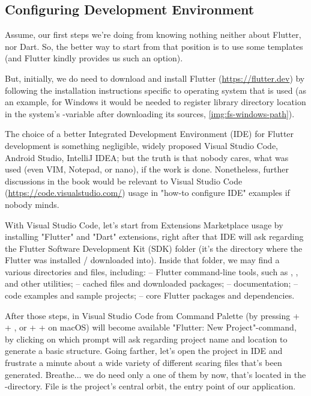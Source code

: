 
\subsection{Configuring Development Environment} \label{first-step}

Assume, our first steps we're doing from knowing nothing neither about Flutter, nor Dart. So, the better way to start 
from that position is to use some templates (and Flutter kindly provides us such an option).

But, initially, we do need to download and install Flutter (\href{https://flutter.dev}{https://flutter.dev}) by 
following the installation instructions specific to operating system that is used (as an example, for Windows it 
would be needed to register library directory location in the system's -variable after downloading its sources, 
\cref{img:fs-windows-path}).


The choice of a better Integrated Development Environment (IDE) for Flutter development is something negligible, widely
proposed Visual Studio Code, Android Studio, IntelliJ IDEA; but the truth is that nobody cares, what was used (even VIM,
Notepad, or nano), if the work is done. Nonetheless, further discussions in the book would be relevant to Visual 
Studio Code (\href{https://code.visualstudio.com/}{https://code.visualstudio.com/}) usage in "how-to configure IDE" 
examples if nobody minds.

With Visual Studio Code, let's start from Extensions Marketplace usage by installing "Flutter" and "Dart" extensions, 
right after that IDE will ask regarding the Flutter Software Development Kit (SDK) folder (it's the directory where 
the Flutter was installed / downloaded into). Inside that folder, we may find a various directories and files, including:
 -- Flutter command-line tools, such as , , and other utilities;
 -- cached files and downloaded packages;
 -- documentation;
 -- code examples and sample projects;
 -- core Flutter packages and dependencies.

After those steps, in Visual Studio Code from Command Palette (by pressing  +  + , or 
 +  +  on macOS) will become available "Flutter: New Project"-command, by clicking on which 
prompt will ask regarding project name and location to generate a basic structure. Going farther, let's open the project 
in IDE and frustrate a minute about a wide variety of different scaring files that's been generated. Breathe... we do 
need only a one of them by now, that's located in the -directory. File  is the project's central 
orbit, the entry point of our application.

